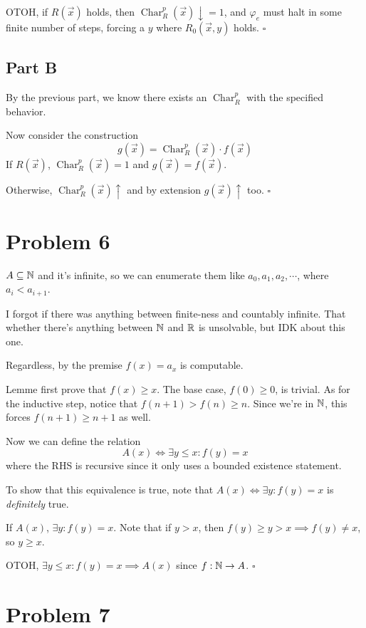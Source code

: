 \documentclass[12pt]{article}
\DeclareMathOperator{\ch}{Char}
\begin{document}
OTOH, if $R(\vec{x})$ holds, then $\ch_R^p(\vec{x})\downarrow = 1$, and $\varphi_e$
must halt in some finite number of steps, forcing a $y$ where $R_0(\vec{x}, y)$ holds. $\square$

\subsection{Part B}

By the previous part, we know there exists an $\ch_R^p$ with the specified behavior.

Now consider the construction
\[g(\vec{x})=\ch_R^p(\vec{x}) \cdot f(\vec{x})\]
If $R(\vec{x})$, $\ch_R^p(\vec{x})=1$ and $g(\vec{x})=f(\vec{x})$.

Otherwise, $\ch_R^p(\vec{x})\uparrow$ and by extension $g(\vec{x})\uparrow$ too. $\square$

\pagebreak

\section{Problem 6}

$A \subseteq \mathbb{N}$ and it's infinite, so we can enumerate them like $a_0, a_1, a_2, \cdots$, where $a_i < a_{i+1}$.

I forgot if there was anything between finite-ness and countably infinite.
That whether there's anything between $\mathbb{N}$ and $\mathbb{R}$ is unsolvable, but IDK about this one.

Regardless, by the premise $f(x)=a_x$ is computable.

Lemme first prove that $f(x) \ge x$.
The base case, $f(0) \ge 0$, is trivial.
As for the inductive step, notice that $f(n+1) > f(n) \ge n$.
Since we're in $\mathbb{N}$, this forces $f(n+1) \ge n+1$ as well.

Now we can define the relation
\[A(x) \iff \exists y \le x: f(y)=x\]
where the RHS is recursive since it only uses a bounded existence statement.

To show that this equivalence is true, note that $A(x) \iff \exists y: f(y)=x$ is \textit{definitely} true.

If $A(x)$, $\exists y: f(y)=x$.
Note that if $y > x$, then $f(y) \ge y > x \implies f(y) \ne x$, so $y \ge x$.

OTOH, $\exists y \le x: f(y)=x \implies A(x)$ since $f: \mathbb{N} \to A$. $\square$

\pagebreak

\section{Problem 7}
\end{document}
